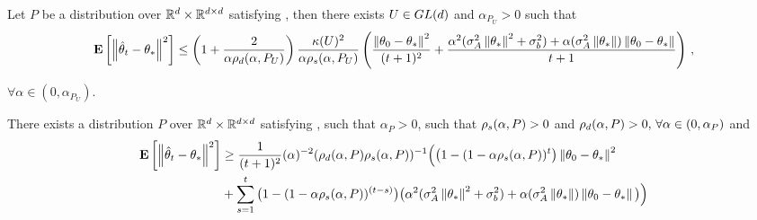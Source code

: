 \begin{theorem}\label{th:rate}
Let $P$ be a distribution over $\mathbb{R}^d\times \mathbb{R}^{d \times d}$ satisfying , then there exists $U\in GL(d)$ and $\alpha_{P_U}>0$ such that
\begin{align*}
\mathbf{E}\left[\left\| \hat{\theta}_t-\theta_*\right\|^2\right]
\leq
\left(1+\frac2{\alpha\rho_d(\alpha,P_U)}\right)\frac{\kappa(U)^2}{\alpha \rho_s(\alpha,P_U)}
\left(\frac{\left\| \theta_0-\theta_*\right\|^2}{(t+1)^2}+ \frac{\alpha^2(\sigma_A^2\left\| \theta_*\right\|^2+\sigma_b^2)+\alpha (\sigma_A^2\left\| \theta_*\right\|)\left\| \theta_0-\theta_*\right\|}{t+1} \right)\,,
\end{align*}
\end{theorem}
$\forall \alpha\in (0,\alpha_{P_U})$.
\begin{theorem}\label{th:lb}
There exists a distribution $P$ over $\mathbb{R}^d\times \mathbb{R}^{d \times d}$ satisfying , such that $\alpha_P>0$, such that $\rho_s(\alpha,P)>0$ and $\rho_d(\alpha,P)>0,\,\forall \alpha\in (0,\alpha_P)$ and
\begin{align*}
\mathbf{E}\left[\left\| \hat{\theta}_t-\theta_*\right\|^2\right] &\geq \frac{1}{(t+1)^2}(\alpha)^{-2}(\rho_d(\alpha,P)\rho_s(\alpha,P))^{-1}\Big( \big(1-(1-\alpha \rho_s(\alpha,P))^t\big) \left\| \theta_0-\theta_*\right\|^2 \\&+ \sum_{s=1}^t \big(1-(1-\alpha \rho_s(\alpha,P))^{(t-s)}\big) \big(\alpha^2(\sigma_A^2\left\| \theta_*\right\|^2+\sigma_b^2)+\alpha (\sigma_A^2\left\| \theta_*\right\|)\left\| \theta_0-\theta_*\right\|\big) \Big)
\end{align*}

\begin{comment}
\begin{align}
\frac{1}{(t+1)^2}(\alpha \lambda_{\min})^{-2}(1-\alpha \lambda_{\min}^t) \theta^2_0(1)\leq \norm{\eh_t}^2\leq
\frac{1}{(t+1)^2} \left(\alpha^{-1}\rhos{P^0}+\alpha^{-2}\rhos{P^0}^2\right)\norm{\theta_0}^2
\end{align}
\end{comment}
\end{theorem}


